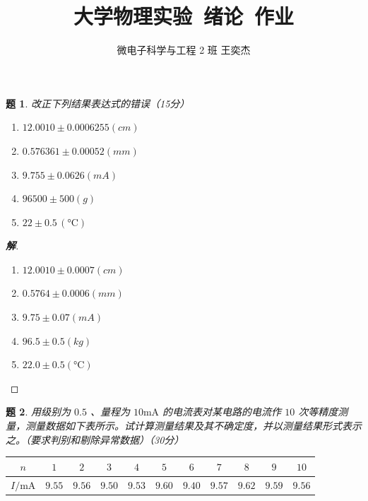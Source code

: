 \documentclass{article}
\title{大学物理实验\ 绪论\ 作业}
\author{微电子科学与工程 2 班 \quad 王奕杰}
\newtheorem{problem}{题}
\newenvironment{solution}
{\begin{proof}[\textbf{解}]\renewcommand{\qedsymbol}{}}
{\end{proof}}
\begin{document}
\maketitle


\noindent
\begin{minipage}[t]{0.48\textwidth}
\begin{problem}
改正下列结果表达式的错误（15分）
\begin{enumerate}[label=(\arabic*)]
  \item $12.0010 \pm 0.0006255 (\unit{cm})$
  \item $0.576361 \pm 0.00052 (\unit{mm})$
  \item $9.755 \pm 0.0626 (\unit{mA})$
  \item $96500 \pm 500 (\unit{g})$
  \item $22 \pm 0.5 \, (\unit{\celsius})$
\end{enumerate}
\end{problem}
\end{minipage}
\hfill
\hfill
\begin{minipage}[t]{0.48\textwidth}
\begin{solution}
\leavevmode
\begin{enumerate}[label=(\arabic*)]
  \item $12.0010 \pm 0.0007 (\unit{cm})$
  \item $0.5764 \pm 0.0006 (\unit{mm})$
  \item $9.75 \pm 0.07 (\unit{mA})$
  \item $96.5 \pm 0.5 (\unit{kg})$
  \item $22.0 \pm 0.5 (\unit{\celsius})$
\end{enumerate}
\end{solution}
\end{minipage}


\begin{problem}
用级别为 $0.5$ 、量程为 $10\mathrm{mA}$ 的电流表对某电路的电流作 $10$ 次等精度测量，测量数据如下表所示。试计算测量结果及其不确定度，并以测量结果形式表示之。（要求判别和剔除异常数据）（30分）
\end{problem}

\begin{table}[h]
\centering
\begin{tabular}{ccccccccccc}
\toprule
$n$ & $1$ & $2$ & $3$ & $4$ & $5$ & $6$ & $7$ & $8$ & $9$ & $10$ \\ \midrule
$I/\text{mA}$ & $9.55$ & $9.56$ & $9.50$ & $9.53$ & $9.60$ & $9.40$ & $9.57$ & $9.62$ & $9.59$ & $9.56$ \\ \bottomrule
\end{tabular}
\end{table}
\end{document}
